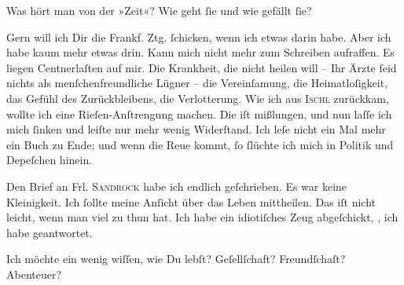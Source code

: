 \pstart
           Was hört man von der »Zeit«? Wie geht ſie und wie
               gefällt ſie?\pend
           
\pstart
           Gern will ich Dir die Frankf. Ztg. ſchicken, wenn
               ich etwas darin habe. Aber ich habe kaum mehr etwas drin. Kann {\pb}mich nicht mehr zum Schreiben aufraffen. Es liegen
               Centnerlaſten auf mir. Die Krankheit, die nicht heilen will – Ihr Ärzte ſeid nichts
               als menſchenfreundliche Lügner – die Vereinſamung, die Heimatloſigkeit, das Gefühl
               des Zurückbleibens, die Verlotterung. Wie ich aus \textsc{Ischl} zurückkam, wollte ich eine Rieſen-Anſtrengung machen. Die iſt mißlungen, und
               nun laſſe ich mich ſinken und leiſte nur mehr wenig Widerſtand. Ich leſe nicht ein
               Mal mehr ein Buch zu Ende; und wenn die Reue kommt, ſo ſlüchte ich mich in Politik
               und Depeſchen hinein.\pend
           
\pstart
           {\pb}Den Brief an Frl. \textsc{Sandrock} habe ich endlich geſchrieben. Es war keine Kleinigkeit. Ich ſollte meine
               Anſicht über das Leben mittheilen. Das iſt nicht leicht, wenn man viel zu thun hat.
               Ich habe ein idiotiſches Zeug abgeſchickt, \textsc{\label{K_L02630-6v}\label{K_L02630-6}}, ich habe geantwortet.\pend
           
\pstart
           Ich möchte ein wenig wiſſen, wie Du lebſt? Geſellſchaft? Freundſchaſt? Abenteuer?\pend
           
